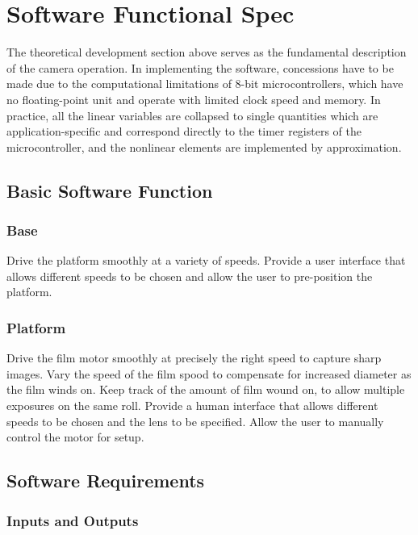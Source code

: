 \documentclass[dvips,12pt]{article}
\begin{document}
\section{Software Functional Spec}

The theoretical development section above serves as the fundamental description of the camera operation. In implementing the software, concessions have to be made due to the computational limitations of 8-bit microcontrollers, which have no floating-point unit and operate with limited clock speed and memory. In practice, all the linear variables are collapsed to single quantities which are application-specific and correspond directly to the timer registers of the microcontroller, and the nonlinear elements are implemented by approximation.

\subsection{Basic Software Function}

\subsubsection{Base}
Drive the platform smoothly at a variety of speeds. Provide a user interface that allows different speeds to be chosen and allow the user to pre-position the platform.

\subsubsection{Platform}
Drive the film motor smoothly at precisely the right speed to capture sharp images. Vary the speed of the film spood to compensate for increased diameter as the film winds on. Keep track of the amount of film wound on, to allow multiple exposures on the same roll. Provide a human interface that allows different speeds to be chosen and the lens to be specified. Allow the user to manually control the motor for setup.

\subsection{Software Requirements}
\subsubsection{Inputs and Outputs}
\end{document}
